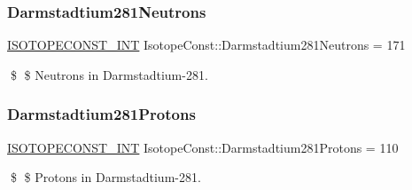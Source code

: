 \subsubsection{\texorpdfstring{Darmstadtium281\+Neutrons}{Darmstadtium281Neutrons}}
{\footnotesize\ttfamily \mbox{\hyperlink{group___isotope_const-_macros_ga5f18360b3e99483a35c32d789e62621c}{I\+S\+O\+T\+O\+P\+E\+C\+O\+N\+S\+T\+\_\+\+I\+NT}} Isotope\+Const\+::\+Darmstadtium281\+Neutrons = 171}

\$ \$ Neutrons in Darmstadtium-\/281. \mbox{\label{group___isotope_const-_darmstadtium-_ds281_gaaf8554cf4b5a0b5a900e07d38e98d391}} 
\subsubsection{\texorpdfstring{Darmstadtium281\+Protons}{Darmstadtium281Protons}}
{\footnotesize\ttfamily \mbox{\hyperlink{group___isotope_const-_macros_ga5f18360b3e99483a35c32d789e62621c}{I\+S\+O\+T\+O\+P\+E\+C\+O\+N\+S\+T\+\_\+\+I\+NT}} Isotope\+Const\+::\+Darmstadtium281\+Protons = 110}

\$ \$ Protons in Darmstadtium-\/281. 